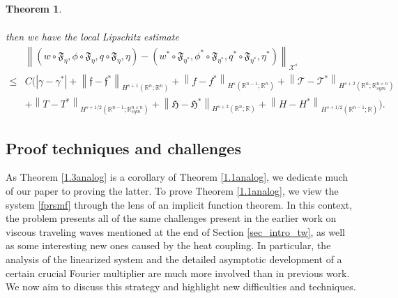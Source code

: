 \documentclass[11pt,letterpaper,reqno]{amsart}
\newtheorem{theorem}{Theorem}[section]
\numberwithin{equation}{section}
\newcommand{\abs}[1]{\left\lvert#1\right\rvert}
\newcommand{\norm}[1]{\left\lVert#1\right\rVert}
\begin{document}
\begin{theorem}
\begin{enumerate}
\begin{align}
        \end{align}
        then we have the local Lipschitz estimate
        \begin{align}
            &\norm{(w \circ \mathfrak{F}_{\eta}, \phi \circ \mathfrak{F}_{\eta}, q \circ \mathfrak{F}_{\eta},\eta)-(w^{*} \circ \mathfrak{F}_{\eta^{*}}, \phi^{*} \circ \mathfrak{F}_{\eta^{*}}, q^{*} \circ \mathfrak{F}_{\eta^{*}},\eta^{*})}_{\mathcal{X}^{s}} \nonumber \\
            \leq &C(\abs{\gamma-\gamma^{*}}+\norm{\mathfrak{f}-\mathfrak{f}^{*}}_{H^{s+1}(\mathbb{R}^{n};\mathbb{R}^{n})}+\norm{f-f^{*}}_{H^{s}(\mathbb{R}^{n-1};\mathbb{R}^{n})}+\norm{\mathcal{T}-\mathcal{T}^{*}}_{H^{s+2}(\mathbb{R}^{n};\mathbb{R}_{sym}^{n\times n})} \nonumber \\
            &+\norm{T-T^{*}}_{H^{s+1/2}(\mathbb{R}^{n-1};\mathbb{R}_{sym}^{n \times n})}+\norm{\mathfrak{H}-\mathfrak{H}^{*}}_{H^{s+2}(\mathbb{R}^{n};\mathbb{R})}+\norm{H-H^{*}}_{H^{s+1/2}(\mathbb{R}^{n-1};\mathbb{R})}).
        \end{align}
    \end{enumerate}
\end{theorem}







\subsection{Proof techniques and challenges} \label{ptc} 
As Theorem \ref{1.3analog} is a corollary of Theorem \ref{1.1analog}, we dedicate much of our paper to proving the latter. To prove Theorem \ref{1.1analog}, we view the system \eqref{fprsmf} through the lens of an implicit function theorem.  In this context, the problem presents all of the same challenges present in the earlier work on viscous traveling waves mentioned at the end of Section \ref{sec_intro_tw}, as well as some interesting new ones caused by the heat coupling.  In particular, the analysis of the linearized system and the detailed asymptotic development of a certain crucial Fourier multiplier are much more involved than in previous work.  We now aim to discuss this strategy and highlight new difficulties and techniques.
\end{document}
